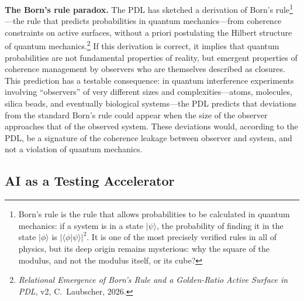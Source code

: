 \documentclass[12pt, a4paper, openright]{book}
\begin{document}
\textbf{The Born's rule paradox.} The PDL has sketched a derivation of Born's rule\footnote{Born's rule is the rule that allows probabilities to be calculated in quantum mechanics: if a system is in a state $|\psi\rangle$, the probability of finding it in the state $|\phi\rangle$ is $|\langle\phi|\psi\rangle|^2$. It is one of the most precisely verified rules in all of physics, but its deep origin remains mysterious: why the square of the modulus, and not the modulus itself, or its cube?}---the rule that predicts probabilities in quantum mechanics---from coherence constraints on active surfaces, without a priori postulating the Hilbert structure of quantum mechanics.\footnote{\textit{Relational Emergence of Born's Rule and a Golden-Ratio Active Surface in PDL}, v2, C.~Laubscher, 2026.} If this derivation is correct, it implies that quantum probabilities are not fundamental properties of reality, but emergent properties of coherence management by observers who are themselves described as closures. This prediction has a testable consequence: in quantum interference experiments involving ``observers'' of very different sizes and complexities---atoms, molecules, silica beads, and eventually biological systems---the PDL predicts that deviations from the standard Born's rule could appear when the size of the observer approaches that of the observed system. These deviations would, according to the PDL, be a signature of the coherence leakage between observer and system, and not a violation of quantum mechanics.

\subsection*{AI as a Testing Accelerator}
\end{document}
